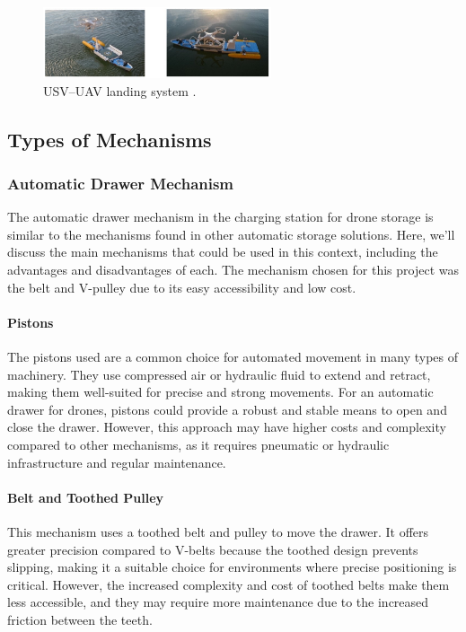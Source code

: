     \begin{figure}[H]
        \centering
        \includegraphics[width=0.6\textwidth]{pictures/mobile_3.png}
        \caption{USV–UAV landing system \cite{grlj_docking_stations}.}
        \label{fig:mobile_charging}
    \end{figure}


\subsection{Types of Mechanisms}

    \subsubsection{Automatic Drawer Mechanism}
    The automatic drawer mechanism in the charging station for drone storage is similar to the mechanisms found in other automatic storage solutions. Here, we'll discuss the main mechanisms that could be used in this context, including the advantages and disadvantages of each. The mechanism chosen for this project was the belt and V-pulley due to its easy accessibility and low cost.
    
    \paragraph{Pistons} The pistons used are a common choice for automated movement in many types of machinery. They use compressed air or hydraulic fluid to extend and retract, making them well-suited for precise and strong movements. For an automatic drawer for drones, pistons could provide a robust and stable means to open and close the drawer. However, this approach may have higher costs and complexity compared to other mechanisms, as it requires pneumatic or hydraulic infrastructure and regular maintenance.
    
    \paragraph{Belt and Toothed Pulley} This mechanism uses a toothed belt and pulley to move the drawer. It offers greater precision compared to V-belts because the toothed design prevents slipping, making it a suitable choice for environments where precise positioning is critical. However, the increased complexity and cost of toothed belts make them less accessible, and they may require more maintenance due to the increased friction between the teeth.
    
